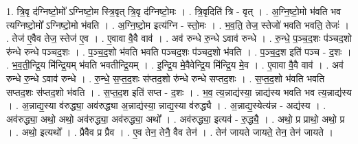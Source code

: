 \documentclass[17pt]{extarticle}
\begin{document}
1. त्रि॒वृ द॑ग्निष्टो॒मो᳚ ऽग्निष्टो॒म स्त्रि॒वृत् त्रि॒वृ द॑ग्निष्टो॒मः । . त्रि॒वृदिति॑ त्रि - वृत् । . अ॒ग्नि॒ष्टो॒मो भ॑वति भव त्यग्निष्टो॒मो᳚ ऽग्निष्टो॒मो भ॑वति । . अ॒ग्नि॒ष्टो॒म इत्य॑ग्नि - स्तो॒मः । . भ॒व॒ति॒ तेज॒ स्तेजो॑ भवति भवति॒ तेजः॑ । . तेज॑ ए॒वैव तेज॒ स्तेज॑ ए॒व । . ए॒वावा वै॒वै वाव॑ । . अव॑ रुन्धे रु॒न्धे ऽवाव॑ रुन्धे । . रु॒न्धे॒ प॒ञ्च॒द॒शः प॑ञ्चद॒शो रु॑न्धे रुन्धे पञ्चद॒शः । . प॒ञ्च॒द॒शो भ॑वति भवति पञ्चद॒शः प॑ञ्चद॒शो भ॑वति । . प॒ञ्च॒द॒श इति॑ पञ्च - द॒शः । . भ॒व॒ती॒न्द्रि॒य मि॑न्द्रि॒यम् भ॑वति भवतीन्द्रि॒यम् । . इ॒न्द्रि॒य मे॒वैवेन्द्रि॒य मि॑न्द्रि॒य मे॒व । . ए॒वावा वै॒वै वाव॑ । . अव॑ रुन्धे रु॒न्धे ऽवाव॑ रुन्धे । . रु॒न्धे॒ स॒प्त॒द॒शः स॑प्तद॒शो रु॑न्धे रुन्धे सप्तद॒शः । . स॒प्त॒द॒शो भ॑वति भवति सप्तद॒शः स॑प्तद॒शो भ॑वति । . स॒प्त॒द॒श इति॑ सप्त - द॒शः । . भ॒व॒ त्य॒न्नाद्य॑स्या॒ न्नाद्य॑स्य भवति भव त्य॒न्नाद्य॑स्य । . अ॒न्नाद्य॒स्या व॑रुद्ध्या॒ अव॑रुद्ध्या अ॒न्नाद्य॑स्या॒ न्नाद्य॒स्या व॑रुद्ध्यै । . अ॒न्नाद्य॒स्येत्य॑न्न - अद्य॑स्य । . अव॑रुद्ध्या॒ अथो॒ अथो॒ अव॑रुद्ध्या॒ अव॑रुद्ध्या॒ अथो᳚ । . अव॑रुद्ध्या॒ इत्यव॑ - रु॒द्ध्यै॒ । . अथो॒ प्र प्राथो॒ अथो॒ प्र । . अथो॒ इत्यथो᳚ । . प्रैवैव प्र प्रैव । . ए॒व तेन॒ तेनै॒ वैव तेन॑ । . तेन॑ जायते जायते॒ तेन॒ तेन॑ जायते । \newline
\end{document}
